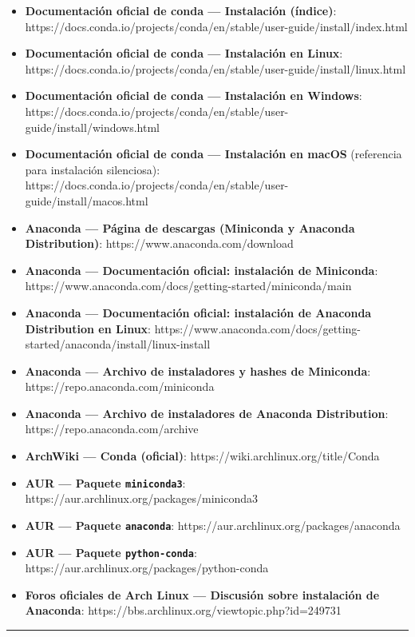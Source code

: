\documentclass[
  doc,
  floatsintext,
  longtable,
  a4paper,
  nolmodern,
  notxfonts,
  notimes,
  12pt,
  colorlinks=true,linkcolor=blue,citecolor=blue,urlcolor=blue]{apa7}
\providecommand{\tightlist}{%
  \setlength{\itemsep}{0pt}\setlength{\parskip}{0pt}}
\begin{document}
\begin{itemize}
\tightlist
\item
  \textbf{Documentación oficial de conda --- Instalación (índice)}:
  https://docs.conda.io/projects/conda/en/stable/user-guide/install/index.html
\item
  \textbf{Documentación oficial de conda --- Instalación en Linux}:
  https://docs.conda.io/projects/conda/en/stable/user-guide/install/linux.html
\item
  \textbf{Documentación oficial de conda --- Instalación en Windows}:
  https://docs.conda.io/projects/conda/en/stable/user-guide/install/windows.html
\item
  \textbf{Documentación oficial de conda --- Instalación en macOS}
  (referencia para instalación silenciosa):
  https://docs.conda.io/projects/conda/en/stable/user-guide/install/macos.html
\item
  \textbf{Anaconda --- Página de descargas (Miniconda y Anaconda
  Distribution)}: https://www.anaconda.com/download
\item
  \textbf{Anaconda --- Documentación oficial: instalación de Miniconda}:
  https://www.anaconda.com/docs/getting-started/miniconda/main
\item
  \textbf{Anaconda --- Documentación oficial: instalación de Anaconda
  Distribution en Linux}:
  https://www.anaconda.com/docs/getting-started/anaconda/install/linux-install
\item
  \textbf{Anaconda --- Archivo de instaladores y hashes de Miniconda}:
  https://repo.anaconda.com/miniconda
\item
  \textbf{Anaconda --- Archivo de instaladores de Anaconda
  Distribution}: https://repo.anaconda.com/archive
\item
  \textbf{ArchWiki --- Conda (oficial)}:
  https://wiki.archlinux.org/title/Conda
\item
  \textbf{AUR --- Paquete \texttt{miniconda3}}:
  https://aur.archlinux.org/packages/miniconda3
\item
  \textbf{AUR --- Paquete \texttt{anaconda}}:
  https://aur.archlinux.org/packages/anaconda
\item
  \textbf{AUR --- Paquete \texttt{python-conda}}:
  https://aur.archlinux.org/packages/python-conda
\item
  \textbf{Foros oficiales de Arch Linux --- Discusión sobre instalación
  de Anaconda}: https://bbs.archlinux.org/viewtopic.php?id=249731
\end{itemize}

\begin{center}\rule{0.5\linewidth}{0.5pt}\end{center}
\end{document}
